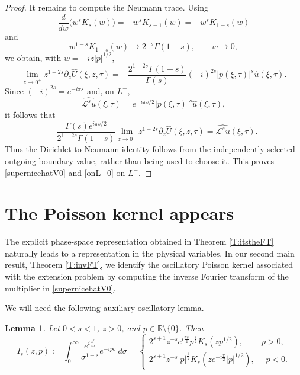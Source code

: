 \documentclass[11pt,letter]{amsart}
\def \G{\Gamma}
\numberwithin{equation}{section}
\newcommand{\Le}{\mathcal L}
\newtheorem{lemma}[theorem]{Lemma}
\numberwithin{equation}{section}
\begin{document}
\begin{proof}
It remains to compute the Neumann trace. Using
\[
\frac{d}{dw}\bigl(w^sK_s(w)\bigr)=-w^sK_{s-1}(w)
=-w^sK_{1-s}(w)
\]
and
\[
w^{1-s}K_{1-s}(w)\longrightarrow 2^{-s}\G(1-s),
\qquad w\to0,
\]
we obtain, with $w=-iz|p|^{1/2}$,
\[
\lim_{z\to0^+}z^{1-2s}\partial_z\widehat U(\xi,z,\tau)
=-\frac{2^{1-2s}\G(1-s)}{\G(s)}
(-i)^{2s}|p(\xi,\tau)|^s\widehat u(\xi,\tau).
\]
Since $(-i)^{2s}=e^{-i\pi s}$ and, on $L^-$,
\[
\widehat{\Le^su}(\xi,\tau)=e^{-i\pi s/2}|p(\xi,\tau)|^s\widehat u(\xi,\tau),
\]
it follows that
\[
-\frac{\G(s)e^{i\pi s/2}}{2^{1-2s}\G(1-s)}
\lim_{z\to0^+}z^{1-2s}\partial_z\widehat U(\xi,z,\tau)
=\widehat{\Le^su}(\xi,\tau).
\]
Thus the Dirichlet-to-Neumann identity follows from the independently selected
outgoing boundary value, rather than being used to choose it. This proves
\eqref{supernicehatV0} and \eqref{onL+0} on $L^-$.

\end{proof}

\section{The Poisson kernel appears} 
\label{S:appears}

The explicit phase-space representation obtained in Theorem \ref{T:itstheFT} naturally leads to a representation in the physical variables. In our second main result, Theorem \ref{T:invFT}, we identify the oscillatory Poisson kernel associated with the extension problem by computing the inverse Fourier transform of the multiplier in \eqref{supernicehatV0}.

We will need the following auxiliary oscillatory lemma.

\begin{lemma}\label{L:critical}
Let $0<s<1$, $z>0$, and $p\in\mathbb{R}\setminus\{0\}$. Then
\[
I_s(z,p)
:=
\int_0^\infty \frac{e^{i\frac{z^2}{4\sigma}}}{\sigma^{1+s}}
e^{-ip\sigma}\,d\sigma = \begin{cases}
2^{s+1}z^{-s} e^{i \frac{\pi s}2} p^{\frac s2} K_s(z p^{1/2}),\ \ \ \ \ \ \ \ \ \ p>0,
\\
2^{s+1}z^{-s}  |p|^{\frac s2} K_s(z e^{-i \frac{\pi }2}|p|^{1/2}),\ \ \ \ \ \ p<0.
\end{cases}
\]
\end{lemma}
\end{document}

